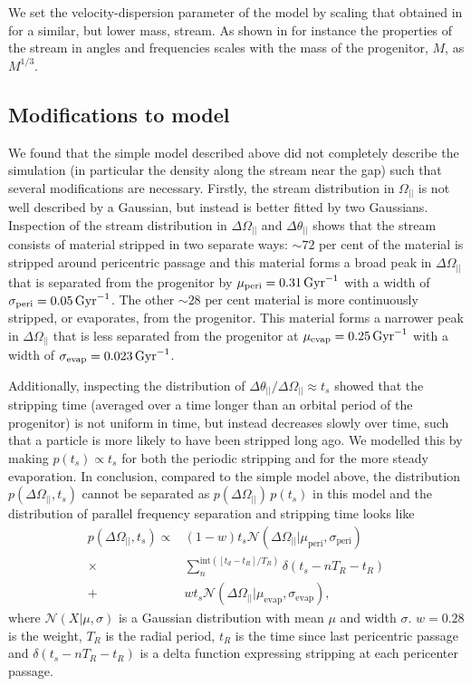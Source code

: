 \documentclass[useAMS,usenatbib,fleqn,a4paper]{mn2e}
\def\Gyr{\,{\rm Gyr}}
\def\percent{\text{ per cent}}
\def\percent{\text{ per cent}}
\begin{document}
We set the velocity-dispersion parameter of the model by scaling that obtained in \cite{Bovy2014} for a similar, but lower mass, stream. As shown in \cite{SandersBinney2013a} for instance the properties of the stream in angles and frequencies scales with the mass of the progenitor, $M$, as $M^{1/3}$.

\subsection{Modifications to model}\label{Sect::modelmods}
We found that the simple model described above did not completely describe the simulation (in particular the density along the stream near the gap) such that several modifications are necessary. Firstly, the stream distribution in $\Omega_{||}$ is not well described by a Gaussian, but instead is better fitted by two Gaussians. Inspection of the stream distribution in $\Delta\Omega_{||}$ and $\Delta\theta_{||}$ shows that the stream consists of material stripped in two separate ways: $\sim72\percent$ of the material is stripped around pericentric passage and this material forms a broad peak in $\Delta\Omega_{||}$ that is separated from the progenitor by $\mu_\mathrm{peri}=0.31\Gyr^{-1}$ with a width of $\sigma_\mathrm{peri}=0.05\Gyr^{-1}$. The other $\sim28\percent$ material is more continuously stripped, or evaporates, from the progenitor. This material forms a narrower peak in $\Delta\Omega_{||}$ that is less separated from the progenitor at $\mu_\mathrm{evap}=0.25\Gyr^{-1}$ with a width of $\sigma_\mathrm{evap}=0.023\Gyr^{-1}$. 

Additionally, inspecting the distribution of $\Delta\theta_{||}/\Delta\Omega_{||}\approx t_s$ showed that the stripping time (averaged over a time longer than an orbital period of the progenitor) is not uniform in time, but instead decreases slowly over time, such that a particle is more likely to have been stripped long ago. We modelled this by making $p(t_s)\propto t_s$ for both the periodic stripping and for the more steady evaporation. In conclusion, compared to the simple model above, the distribution $p(\Delta\Omega_{||},t_s)$ cannot be separated as $p(\Delta\Omega_{||})\,p(t_s)$ in this model and the distribution of parallel frequency separation and stripping time looks like
\begin{equation}
\begin{split}
p(\Delta\Omega_{||},t_s) \propto &(1-w)t_s\mathcal{N}(\Delta\Omega_{||}|\mu_\mathrm{peri},\sigma_\mathrm{peri})\\\times&\sum_n^{\mathrm{int}([t_d-t_R]/T_R)}\delta(t_s-nT_R-t_R)\\+&wt_s\mathcal{N}(\Delta\Omega_{||}|\mu_\mathrm{evap},\sigma_\mathrm{evap}),
\end{split}
\end{equation}
where $\mathcal{N}(X|\mu,\sigma)$ is a Gaussian distribution with mean $\mu$ and width $\sigma$. $w=0.28$ is the weight, $T_R$ is the radial period, $t_R$ is the time since last pericentric passage and $\delta(t_s-nT_R-t_R)$ is a delta function expressing stripping at each pericenter passage.
\end{document}
